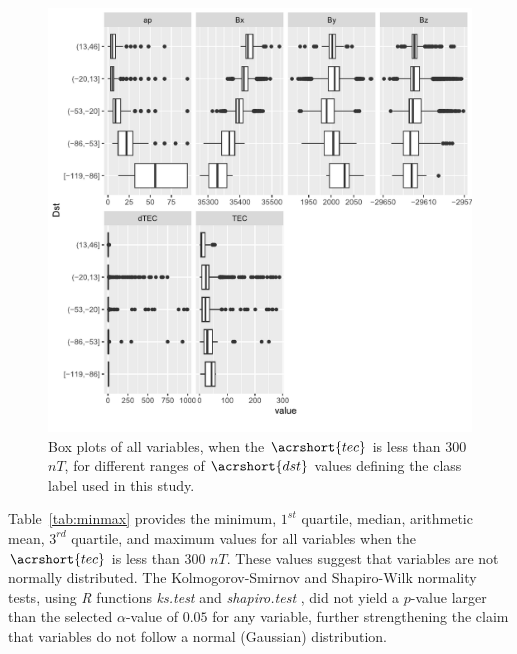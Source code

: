 \documentclass[sn-mathphys-num]{sn-jnl}%
\begin{document}
\begin{figure}
    \centering
    \includegraphics[width=0.9\linewidth]{iono3boxplot_fix.pdf}
    \caption{Box plots of all variables, when the $\acrshort{tec}$ is less than $300$ $nT$, for different ranges of $\acrshort{dst}$ values defining the class label used in this study.}
    \label{fig:iono3boxplot}
\end{figure}

Table~\ref{tab:minmax} provides the minimum, $1^{st}$ quartile, median, arithmetic mean, $3^{rd}$ quartile, and maximum values for all variables when the $\acrshort{tec}$ is less than $300$ $nT$. These values suggest that variables are not normally distributed. The Kolmogorov-Smirnov and Shapiro-Wilk normality tests, using \textit{R} functions \textit{ks.test} \cite{ks.test2024} and \textit{shapiro.test} \cite{shapiro.test2024}, did not yield a $p$-value larger than the selected $\alpha$-value of $0.05$ for any variable, further strengthening the claim that variables do not follow a normal (Gaussian) distribution. 
\end{document}
